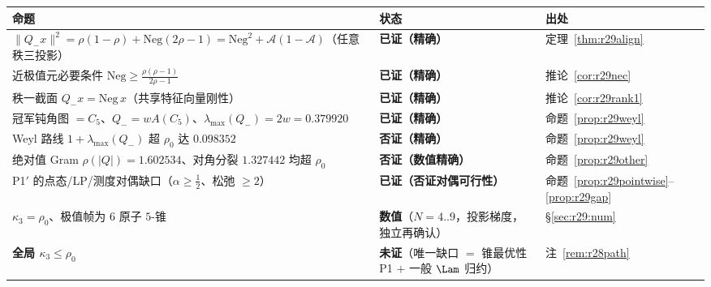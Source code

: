 \begin{center}\small
\begin{tabular}{p{}p{}p{}}
\toprule
命题 & 状态 & 出处\\
\midrule
$\|Q_-x\|^2=\rho(1-\rho)+\mathrm{Neg}(2\rho-1)=\mathrm{Neg}^2+\mathcal A(1-\mathcal A)$（任意秩三投影） & \textbf{已证（精确）} & 定理~\ref{thm:r29align}\\
近极值元必要条件 $\mathrm{Neg}\ge\frac{\rho(\rho-1)}{2\rho-1}$ & \textbf{已证（精确）} & 推论~\ref{cor:r29nec}\\
秩一截面 $Q_-x=\mathrm{Neg}\,x$（共享特征向量刚性） & \textbf{已证（精确）} & 推论~\ref{cor:r29rank1}\\
冠军钝角图 $=C_5$、$Q_-=wA(C_5)$、$\lambda_{\max}(Q_-)=2w=0.379920$ & \textbf{已证（精确）} & 命题~\ref{prop:r29weyl}\\
Weyl 路线 $1+\lambda_{\max}(Q_-)$ 超 $\rho_0$ 达 $0.098352$ & \textbf{否证（精确）} & 命题~\ref{prop:r29weyl}\\
绝对值 Gram $\rho(|Q|)=1.602534$、对角分裂 $1.327442$ 均超 $\rho_0$ & \textbf{否证（数值精确）} & 命题~\ref{prop:r29other}\\
P1$'$ 的点态/LP/测度对偶缺口（$\alpha\ge\frac12$、松弛 $\ge2$） & \textbf{已证（否证对偶可行性）} & 命题~\ref{prop:r29pointwise}--\ref{prop:r29gap}\\
$\kappa_3=\rho_0$、极值帧为 $6$ 原子 $5$-锥 & \textbf{数值}（$N=4..9$，投影梯度，独立再确认）& \S\ref{sec:r29:num}\\
\textbf{全局 $\kappa_3\le\rho_0$} & \textbf{未证}（唯一缺口 $=$ 锥最优性 P1 $+$ 一般 $\Lam$ 归约）& 注~\ref{rem:r28path}\\
\bottomrule
\end{tabular}
\end{center}

